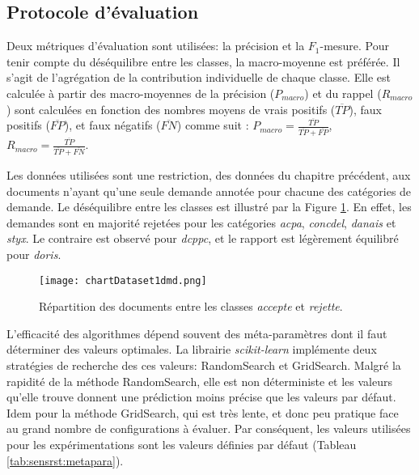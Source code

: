 
\subsection{Protocole d'évaluation}
Deux métriques d'évaluation sont utilisées: la précision et la $F_1$-mesure. Pour tenir compte du déséquilibre entre les classes, la macro-moyenne est préférée. Il s'agit de l'agrégation de la contribution individuelle de chaque classe. 
Elle est calculée à partir des macro-moyennes de la précision ($P_{macro}$) et du rappel ($R_{macro}$) sont calculées en fonction des nombres moyens de vrais positifs ($\overline{TP}$), faux positifs ($\overline{FP}$), et faux négatifs ($\overline{FN}$) comme suit \citep{van2013macromicroeval}:
$P_{macro} = \frac{\overline{TP}}{\overline{TP} + \overline{FP}}$, $R_{macro} = \frac{\overline{TP}}{\overline{TP} + \overline{FN}}$.


Les données utilisées sont une restriction, des données du chapitre précédent, aux documents n'ayant qu'une seule demande annotée pour chacune des catégories de demande. Le déséquilibre entre les classes est illustré par la Figure \ref{fig:sensresultat:stat-1dmd}. En effet, les demandes sont en majorité rejetées pour les catégories \textit{acpa}, \textit{concdel}, \textit{danais} et \textit{styx}. Le contraire est observé pour \textit{dcppc}, et le rapport est légèrement équilibré pour \textit{doris}.
\begin{figure}[htb]
	\centering
\texttt{[image: chartDataset1dmd.png]}
\caption{Répartition des documents entre les classes \textit{accepte} et \textit{rejette}.}\label{fig:sensresultat:stat-1dmd}
\end{figure}

L'efficacité des algorithmes dépend souvent des méta-paramètres dont il faut déterminer des valeurs optimales. La librairie \textit{scikit-learn} \citep{Pedregosa2011sklearn} implémente deux stratégies de recherche des ces valeurs: RandomSearch et GridSearch. Malgré la rapidité de la méthode RandomSearch, elle est non déterministe et les valeurs qu'elle trouve donnent une prédiction moins précise que les valeurs par défaut. Idem pour la méthode GridSearch, qui est très lente, et donc peu pratique face au grand nombre de configurations à évaluer. Par conséquent, les valeurs utilisées pour les expérimentations sont les valeurs définies par défaut (Tableau \ref{tab:sensrst:metapara}).

